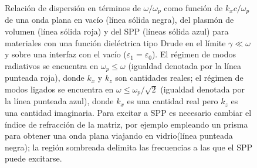 \begin{figure}[h!]\centering
\vspace*{-1em}
	\caption{Relación de dispersión en términos de $\omega/\omega_p$ como función de $k_xc/\omega_p$ de una onda plana en vacío (línea sólida negra), del plasmón de volumen (línea sólida roja) y del SPP (líneas sólida azul) para materiales con una función dieléctrica tipo Drude en el límite $\gamma\ll\omega$ y sobre una interfaz con el vacío ($\varepsilon_1 =\varepsilon_0$). El régimen de modos radiativos se encuentra en $\omega_p\leq\omega$ (igualdad denotada por la línea punteada roja), donde $k_x$ y $k_z$ son cantidades reales; el régimen de modos ligados se encuentra en $\omega\leq\omega_p/\sqrt{2}$ (igualdad denotada por la línea punteada azul), donde $k_x$ es una cantidad real pero $k_z$ es una cantidad imaginaria. Para excitar a SPP es necesario cambiar el índice de refracción de la matriz, por ejemplo empleando un prisma para obtener una onda plana viajando en vidrio(línea punteada negra); la región sombreada delimita las frecuencias a las que el SPP puede excitarse.}
	\label{fig:Relaciones_de_dispersion}
	\end{figure}	


